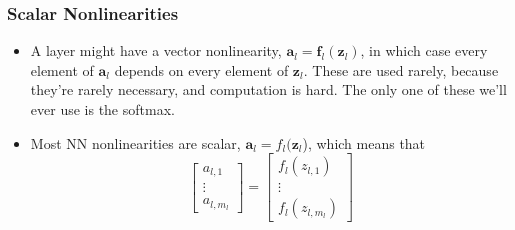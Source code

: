 \documentclass{beamer}
\begin{document}
\begin{frame}
  \frametitle{Scalar Nonlinearities}

  \begin{itemize}
  \item A layer might have a vector nonlinearity,
    $\mathbf{a}_l=\mathbf{f}_l(\mathbf{z}_l)$, in which case every
    element of $\mathbf{a}_l$ depends on every element of
    $\mathbf{z}_l$.  These are used rarely, because they're rarely
    necessary, and computation is hard.  The only one of these we'll
    ever use is the softmax.
  \item Most NN nonlinearities are scalar,
    $\mathbf{a}_l=f_l(\mathbf{z}_l$), which means that
    \begin{displaymath}
      \left[\begin{array}{c}a_{l,1}\\\vdots\\a_{l,m_l}\end{array}\right]=
      \left[\begin{array}{c}f_l(z_{l,1})\\\vdots\\f_l(z_{l,m_l})\end{array}\right]
    \end{displaymath}
  \end{itemize}
\end{frame}
\end{document}
